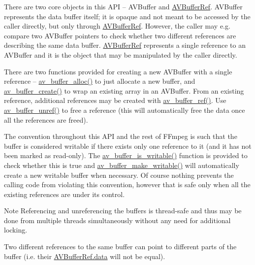 There are two core objects in this A\+PI -- A\+V\+Buffer and \hyperlink{struct_a_v_buffer_ref}{A\+V\+Buffer\+Ref}. A\+V\+Buffer represents the data buffer itself; it is opaque and not meant to be accessed by the caller directly, but only through \hyperlink{struct_a_v_buffer_ref}{A\+V\+Buffer\+Ref}. However, the caller may e.\+g. compare two A\+V\+Buffer pointers to check whether two different references are describing the same data buffer. \hyperlink{struct_a_v_buffer_ref}{A\+V\+Buffer\+Ref} represents a single reference to an A\+V\+Buffer and it is the object that may be manipulated by the caller directly.

There are two functions provided for creating a new A\+V\+Buffer with a single reference -- \hyperlink{group__lavu__buffer_ga5ae84ac902283dea1a660ede06c1cdac}{av\+\_\+buffer\+\_\+alloc()} to just allocate a new buffer, and \hyperlink{group__lavu__buffer_ga3e7f4c92db85ccba0b2a16dd0069842a}{av\+\_\+buffer\+\_\+create()} to wrap an existing array in an A\+V\+Buffer. From an existing reference, additional references may be created with \hyperlink{group__lavu__buffer_gaa40ce7d3ede946a89d03323bbd7268c1}{av\+\_\+buffer\+\_\+ref()}. Use \hyperlink{group__lavu__buffer_ga135e9e929b5033bb8f68322497b2effc}{av\+\_\+buffer\+\_\+unref()} to free a reference (this will automatically free the data once all the references are freed).

The convention throughout this A\+PI and the rest of F\+Fmpeg is such that the buffer is considered writable if there exists only one reference to it (and it has not been marked as read-\/only). The \hyperlink{group__lavu__buffer_ga060be34ace567ae378fd0a786e847053}{av\+\_\+buffer\+\_\+is\+\_\+writable()} function is provided to check whether this is true and \hyperlink{group__lavu__buffer_ga9c2a1be1b7bb80eec8613fdb62a19074}{av\+\_\+buffer\+\_\+make\+\_\+writable()} will automatically create a new writable buffer when necessary. Of course nothing prevents the calling code from violating this convention, however that is safe only when all the existing references are under its control.

\begin{DoxyNote}{Note}
Referencing and unreferencing the buffers is thread-\/safe and thus may be done from multiple threads simultaneously without any need for additional locking.

Two different references to the same buffer can point to different parts of the buffer (i.\+e. their \hyperlink{struct_a_v_buffer_ref_acb8452e99cd75074b93800b532c6ea4b}{A\+V\+Buffer\+Ref.\+data} will not be equal). 
\end{DoxyNote}


